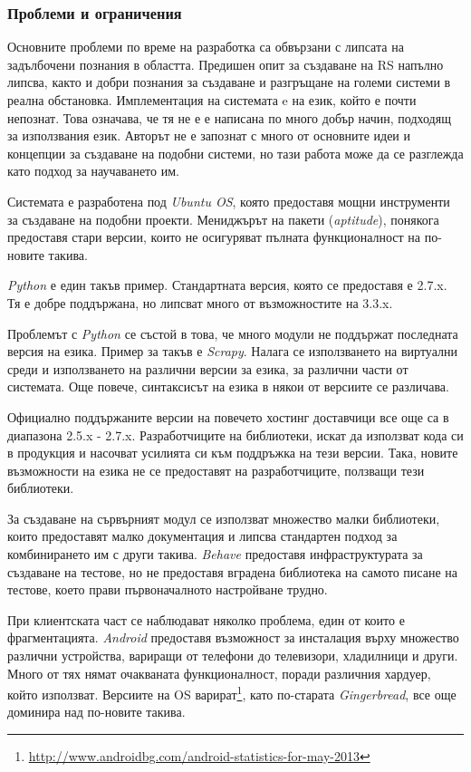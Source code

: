 \subsubsection{Проблеми и ограничения}

	Основните проблеми по време на разработка са обвързани с липсата на задълбочени познания в областта. Предишен опит за създаване на \ac{RS} напълно липсва, както и добри познания за създаване и разгръщане на големи системи в реална обстановка. Имплементация на системата e на език, който е почти непознат. Това означава, че тя не е е написана по много добър начин, подходящ за използвания език. Авторът не е запознат с много от основните идеи и концепции за създаване на подобни системи, но тази работа може да се разглежда като подход за научаването им.

	Системата е разработена под \emph{Ubuntu \ac{OS}}, която предоставя мощни инструменти за създаване на подобни проекти. Мениджърът на пакети (\emph{aptitude}), понякога предоставя стари версии, които не осигуряват пълната функционалност на по-новите такива.
	
	\emph{Python} е един такъв пример. Стандартната версия, която се предоставя е 2.7.x. Тя е добре поддържана, но липсват много от възможностите на 3.3.x. 
	
	Проблемът с \emph{Python} се състой в това, че много модули не поддържат последната версия на езика. Пример за такъв е \emph{Scrapy}. Налага се използването на виртуални среди и използването на различни версии за езика, за различни части от системата. Още повече, синтаксисът на езика в някои от версиите се различава.
	
	Официално поддържаните версии на повечето хостинг доставчици все още са в диапазона 2.5.x - 2.7.x. Разработчиците на библиотеки, искат да използват кода си в продукция и насочват усилията си към поддръжка на тези версии. Така, новите възможности на езика не се предоставят на разработчиците, ползващи тези библиотеки.
	
	За създаване на сървърният модул се използват множество малки библиотеки, които предоставят малко документация и липсва стандартен подход за комбинирането им с други такива. \emph{Behave} предоставя инфраструктурата за създаване на тестове, но не предоставя вградена библиотека на самото писане на тестове, което прави първоначалното настройване трудно.
	
	При клиентската част се наблюдават няколко проблема, един от които е фрагментацията. \emph{Android} предоставя възможност за инсталация върху множество различни устройства, вариращи от телефони до телевизори, хладилници и други. Много от тях нямат очакваната функционалност, поради различния хардуер, който използват. Версиите на \ac{OS} варират\footnote{\url{http://www.androidbg.com/android-statistics-for-may-2013}}, като по-старата \emph{Gingerbread}, все още доминира над по-новите такива.
	

